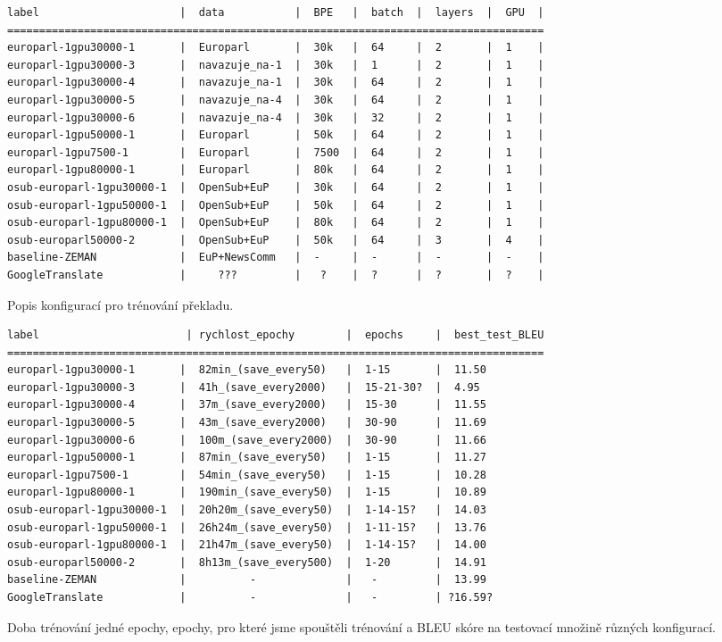 \documentclass[a4]{article}
\begin{document}
\begin{table}[htpb]
\begin{verbatim}
label                      |  data           |  BPE   |  batch  |  layers  |  GPU  |  
====================================================================================
europarl-1gpu30000-1       |  Europarl       |  30k   |  64     |  2       |  1    |  
europarl-1gpu30000-3       |  navazuje_na-1  |  30k   |  1      |  2       |  1    |  
europarl-1gpu30000-4       |  navazuje_na-1  |  30k   |  64     |  2       |  1    |  
europarl-1gpu30000-5       |  navazuje_na-4  |  30k   |  64     |  2       |  1    |  
europarl-1gpu30000-6       |  navazuje_na-4  |  30k   |  32     |  2       |  1    |  
europarl-1gpu50000-1       |  Europarl       |  50k   |  64     |  2       |  1    |  
europarl-1gpu7500-1        |  Europarl       |  7500  |  64     |  2       |  1    |  
europarl-1gpu80000-1       |  Europarl       |  80k   |  64     |  2       |  1    |  
osub-europarl-1gpu30000-1  |  OpenSub+EuP    |  30k   |  64     |  2       |  1    |  
osub-europarl-1gpu50000-1  |  OpenSub+EuP    |  50k   |  64     |  2       |  1    |  
osub-europarl-1gpu80000-1  |  OpenSub+EuP    |  80k   |  64     |  2       |  1    |  
osub-europarl50000-2       |  OpenSub+EuP    |  50k   |  64     |  3       |  4    |  
baseline-ZEMAN             |  EuP+NewsComm   |  -     |  -      |  -       |  -    |
GoogleTranslate            |     ???         |   ?    |  ?      |  ?       |  ?    |
\end{verbatim}
\caption{Popis konfigurací pro trénování překladu.}
\label{tab:config}
%
%
%
%
\begin{verbatim}
label                       | rychlost_epochy        |  epochs     |  best_test_BLEU
====================================================================================
europarl-1gpu30000-1       |  82min_(save_every50)   |  1-15       |  11.50
europarl-1gpu30000-3       |  41h_(save_every2000)   |  15-21-30?  |  4.95
europarl-1gpu30000-4       |  37m_(save_every2000)   |  15-30      |  11.55
europarl-1gpu30000-5       |  43m_(save_every2000)   |  30-90      |  11.69
europarl-1gpu30000-6       |  100m_(save_every2000)  |  30-90      |  11.66
europarl-1gpu50000-1       |  87min_(save_every50)   |  1-15       |  11.27
europarl-1gpu7500-1        |  54min_(save_every50)   |  1-15       |  10.28
europarl-1gpu80000-1       |  190min_(save_every50)  |  1-15       |  10.89
osub-europarl-1gpu30000-1  |  20h20m_(save_every50)  |  1-14-15?   |  14.03
osub-europarl-1gpu50000-1  |  26h24m_(save_every50)  |  1-11-15?   |  13.76
osub-europarl-1gpu80000-1  |  21h47m_(save_every50)  |  1-14-15?   |  14.00
osub-europarl50000-2       |  8h13m_(save_every500)  |  1-20       |  14.91
baseline-ZEMAN             |          -              |   -         |  13.99
GoogleTranslate            |          -              |   -         | ?16.59?
\end{verbatim}
\caption{Doba trénování jedné epochy, epochy, pro které jsme spouštěli
trénování a BLEU skóre na testovací množině různých konfigurací.}
\label{tab:results}
\end{table}
\end{document}
